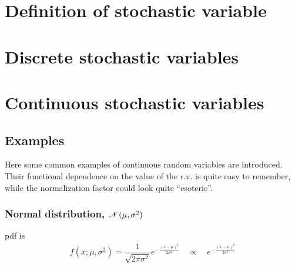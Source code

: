 \documentclass[letterpaper,10pt,english]{jupyterBook}
\begin{document}
\section{Definition of stochastic variable}
\label{\detokenize{ch/prob/rv-def:definition-of-stochastic-variable}}\label{\detokenize{ch/prob/rv-def:prob-rv-def}}\label{\detokenize{ch/prob/rv-def::doc}}
\sphinxstepscope


\section{Discrete stochastic variables}
\label{\detokenize{ch/prob/rv-discrete:discrete-stochastic-variables}}\label{\detokenize{ch/prob/rv-discrete:prob-rv-discrete}}\label{\detokenize{ch/prob/rv-discrete::doc}}
\sphinxstepscope


\section{Continuous stochastic variables}
\label{\detokenize{ch/prob/rv-continuous:continuous-stochastic-variables}}\label{\detokenize{ch/prob/rv-continuous:prob-rv-continuous}}\label{\detokenize{ch/prob/rv-continuous::doc}}

\subsection{Examples}
\label{\detokenize{ch/prob/rv-continuous:examples}}\label{\detokenize{ch/prob/rv-continuous:prob-rv-continuous-ex}}
\sphinxAtStartPar
Here some common examples of continuous random variables are introduced. Their functional dependence on the value of the r.v. is quite easy to remember, while the normalization factor could look quite “esoteric”.


\subsubsection{Normal distribution, \protect\(\mathscr{N}(\mu, \sigma^2)\protect\)}
\label{\detokenize{ch/prob/rv-continuous:normal-distribution-mathscr-n-mu-sigma-2}}\label{\detokenize{ch/prob/rv-continuous:prob-rv-continuous-ex-normal}}
\sphinxAtStartPar
pdf is
\begin{equation*}
\begin{split}f(x; \mu, \sigma^2) = \dfrac{1}{\sqrt{2 \pi \sigma^2}}  e^{-\frac{(x-\mu)^2}{2 \sigma^2}}  \quad \propto \quad e^{- \frac{(x-\mu)^2}{2 \sigma^2}}\end{split}
\end{equation*}
\end{document}
